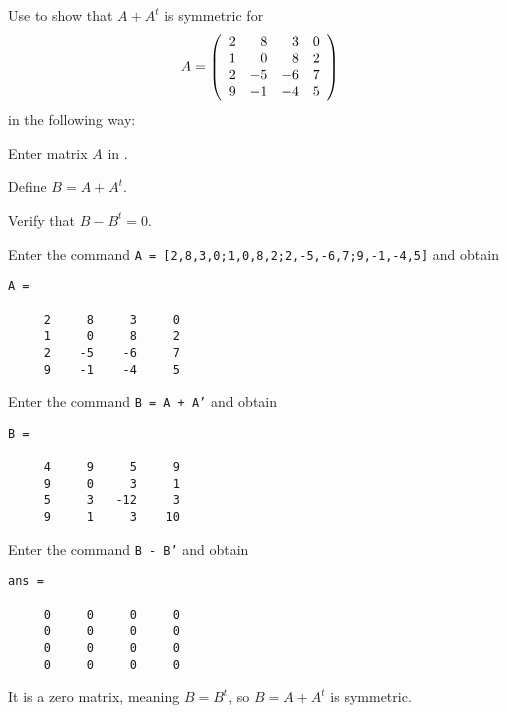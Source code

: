 \documentclass{ximera}
\begin{document}
\begin{computerExercise} \label{YZ_1.3_sym3}
Use \Matlab to show that $A+A^t$ is symmetric for 
\[
A=\left(\begin{array}{rrrrrrrrrrrrrrrrrr} 2&8&3&0\\1&0&8&2\\2&-5&-6&7\\9&-1&-4&5 \end{array}\right)
\]
in the following way: 
\begin{enumeratea}
\item Enter matrix $A$ in \Matlab.
\item Define $B=A+A^t$.
\item Verify that $B-B^t=0$.
\end{enumeratea}

\begin{solution}
\soln
\begin{enumeratea}

\item Enter the command {\tt A = [2,8,3,0;1,0,8,2;2,-5,-6,7;9,-1,-4,5]} and obtain
\begin{verbatim}
A =

     2     8     3     0
     1     0     8     2
     2    -5    -6     7
     9    -1    -4     5
\end{verbatim}
\item Enter the command {\tt B = A + A'} and obtain
\begin{verbatim}
B =

     4     9     5     9
     9     0     3     1
     5     3   -12     3
     9     1     3    10
\end{verbatim}
\item Enter the command {\tt B - B'} and obtain
\begin{verbatim}
ans =

     0     0     0     0
     0     0     0     0
     0     0     0     0
     0     0     0     0

\end{verbatim}
It is a zero matrix, meaning $B=B^t$, so $B=A+A^t$ is symmetric.
\end{enumeratea}
\end{solution}
\end{computerExercise}
\end{document}

